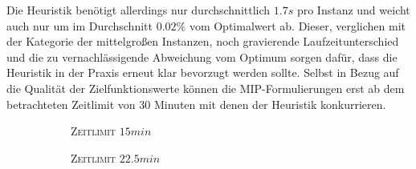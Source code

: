 Die Heuristik benötigt allerdings nur durchschnittlich $1.7s$ pro Instanz und weicht auch nur um im Durchschnitt $0.02 \%$ vom Optimalwert ab. Dieser, verglichen mit der Kategorie der mittelgroßen Instanzen, noch gravierende Laufzeitunterschied und die zu vernachlässigende Abweichung vom Optimum sorgen dafür, dass die Heuristik in der Praxis erneut klar bevorzugt werden sollte.
Selbst in Bezug auf die Qualität der Zielfunktionswerte können die MIP-Formulierungen erst ab dem betrachteten Zeitlimit von $30$ Minuten mit denen der Heuristik konkurrieren.

\begin{figure}[H]
\begin{subfigure}[b]{0.3\textwidth}
\centering
{}
\caption{\textsc{Zeitlimit} $15min$}
\label{fig:res_b=2_l_a}
\end{subfigure}
\begin{subfigure}[b]{0.3\textwidth}
\centering
{}
\caption{\textsc{Zeitlimit} $22.5min$}
\label{fig:res_b=2_l_b}
\end{subfigure}
\begin{subfigure}[b]{0.3\textwidth}

\end{subfigure}
\end{figure}

